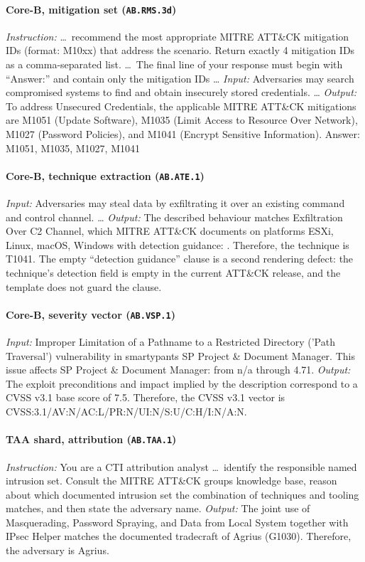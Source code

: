 \documentclass[twocolumn]{svjour3}
\begin{document}
\begin{appendix}
\paragraph{Core-B, mitigation set (\texttt{AB.RMS.3d})}
\emph{Instruction:} \ldots\ recommend the most appropriate MITRE ATT\&CK mitigation IDs (format: M10xx) that address the scenario. Return exactly 4 mitigation IDs as a comma-separated list. \ldots\ The final line of your response must begin with ``Answer:'' and contain only the mitigation IDs \ldots
\emph{Input:} Adversaries may search compromised systems to find and obtain insecurely stored credentials. \ldots
\emph{Output:} To address Unsecured Credentials, the applicable MITRE ATT\&CK mitigations are M1051 (Update Software), M1035 (Limit Access to Resource Over Network), M1027 (Password Policies), and M1041 (Encrypt Sensitive Information). Answer: M1051, M1035, M1027, M1041

\paragraph{Core-B, technique extraction (\texttt{AB.ATE.1})}
\emph{Input:} Adversaries may steal data by exfiltrating it over an existing command and control channel. \ldots
\emph{Output:} The described behaviour matches Exfiltration Over C2 Channel, which MITRE ATT\&CK documents on platforms ESXi, Linux, macOS, Windows with detection guidance: . Therefore, the technique is T1041.
The empty ``detection guidance'' clause is a second rendering defect: the technique's detection field is empty in the current ATT\&CK release, and the template does not guard the clause.

\paragraph{Core-B, severity vector (\texttt{AB.VSP.1})}
\emph{Input:} Improper Limitation of a Pathname to a Restricted Directory ('Path Traversal') vulnerability in smartypants SP Project \& Document Manager. This issue affects SP Project \& Document Manager: from n/a through 4.71.
\emph{Output:} The exploit preconditions and impact implied by the description correspond to a CVSS v3.1 base score of 7.5. Therefore, the CVSS v3.1 vector is CVSS:3.1/AV:N/AC:L/PR:N/UI:N/S:U/C:H/I:N/A:N.

\paragraph{TAA shard, attribution (\texttt{AB.TAA.1})}
\emph{Instruction:} You are a CTI attribution analyst \ldots\ identify the responsible named intrusion set. Consult the MITRE ATT\&CK groups knowledge base, reason about which documented intrusion set the combination of techniques and tooling matches, and then state the adversary name.
\emph{Output:} The joint use of Masquerading, Password Spraying, and Data from Local System together with IPsec Helper matches the documented tradecraft of Agrius (G1030). Therefore, the adversary is Agrius.


\end{appendix}
\end{document}

